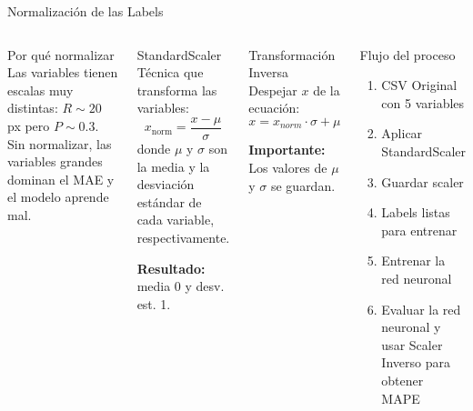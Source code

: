 \begin{frame}{Normalización de las Labels}
    \begin{columns}[T]
        
        \begin{block}{Por qué normalizar}
            Las variables tienen escalas muy distintas: $R \sim 20$ \, px pero  $P \sim 0.3$. Sin normalizar, las variables grandes dominan el MAE y el modelo aprende mal.
        \end{block}

        \begin{exampleblock}{StandardScaler}
            Técnica que transforma las variables:
            $$x_{\text{norm}} = \frac{x - \mu}{\sigma}$$
            donde $\mu$ y $\sigma$ son la media y la desviación estándar de cada variable, respectivamente.
            
            \textbf{Resultado:} media 0 y desv. est. 1.
        \end{exampleblock}
        
        
        \begin{exampleblock}{Transformación Inversa}
            Despejar $x$ de la ecuación:
            $$x = x_{norm} \cdot \sigma + \mu$$
            
            \textbf{Importante:} Los valores de $\mu$ y $\sigma$ se guardan.
        \end{exampleblock}
        
        \begin{block}{Flujo del proceso}
            \small
            \begin{enumerate}
                \item CSV Original con 5 variables
                \item Aplicar StandardScaler
                \item Guardar scaler
                \item Labels listas para entrenar
                \item Entrenar la red neuronal
                \item Evaluar la red neuronal y usar Scaler Inverso para obtener MAPE
            \end{enumerate}
        \end{block}
    \end{columns}
\end{frame}

